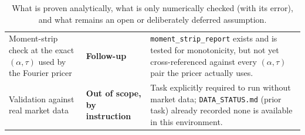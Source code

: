 \begin{table}[H]
\begin{tabular}{p{5.6cm}p{3.3cm}p{5.6cm}}
Moment-strip check at the exact $(\alpha,\tau)$ used by the Fourier pricer &
  \textbf{Follow-up} & \texttt{moment\_strip\_report} exists and is tested for monotonicity, but not yet cross-referenced against every $(\alpha,\tau)$ pair the pricer actually uses. \\
Validation against real market data &
  \textbf{Out of scope, by instruction} & Task explicitly required to run without market data; \texttt{DATA\_STATUS.md} (prior task) already recorded none is available in this environment. \\
\bottomrule
\end{tabular}
\caption{What is proven analytically, what is only numerically checked (with
its error), and what remains an open or deliberately deferred assumption.}
\label{tab:guarantees}
\end{table}

